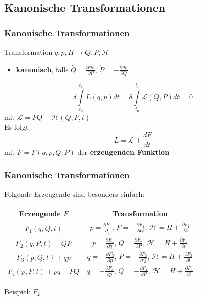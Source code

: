 \documentclass[hyperref={pdfpagelabels=false}]{beamer}
\begin{document}
\subsection*{Kanonische Transformationen}
\begin{frame}
\frametitle{Kanonische Transformationen}
Transformation $q,p,H\rightarrow Q,P,\mathcal{H}$\pause
\begin{itemize}
\item \textbf{kanonisch}, falls
$\dot{Q} = \frac{\partial\mathcal{H}}{\partial P}$, $\dot{P} = - \frac{\partial \mathcal{H}}{\partial Q}$
\end{itemize}
\begin{equation*}
\delta \int\limits_{t_0}^{t_1} L(q,p) dt = \delta \int\limits_{t_0}^{t_1} \mathcal{L}(Q,P) dt = 0
\end{equation*}
mit $\mathcal{L} = P\dot{Q}-\mathcal{H}(Q,P,t)$\\
\vspace*{1cm}\pause
Es folgt
\begin{equation*}
L = \mathcal{L} + \frac{dF}{dt}
\end{equation*}
mit $F = F(q,p,Q,P)$ der \textbf{erzeugenden Funktion}
\end{frame}
\begin{frame}
\frametitle{Kanonische Transformationen}
Folgende Erzeugende sind besonders einfach:\\
\begin{center}
\begin{tabular}{c|c}
Erzeugende $F$ & Transformation \\ 
\hline 
$F_1(q,Q,t)$ & $p = \frac{\partial F_1}{\partial_q}$, $P = - \frac{\partial F_1}{\partial Q}$, $\mathcal{H} = H + \frac{\partial F_1}{\partial t}$ \\ 
$F_2(q,P,t)-QP$ & $p = \frac{\partial F_2}{\partial q}$, $Q = \frac{\partial F_2}{\partial P}$, $\mathcal{H} = H + \frac{\partial F_2}{\partial t}$ \\ 
$F_3(p,Q,t)+qp$ & $q = - \frac{\partial F_3}{\partial p}$, $P = - \frac{\partial F_3}{\partial Q}$, $\mathcal{H} = H + \frac{\partial F_3}{\partial t}$ \\ 
$F_4(p,P,t)+pq-PQ$ & $q = -\frac{\partial F_4}{\partial p}$, $Q = - \frac{\partial F_4}{\partial P}$, $\mathcal{H} = H + \frac{\partial F_4}{\partial t}$ 
\end{tabular} 
\end{center}
Beispiel: $F_2$
\end{frame}
\end{document}
